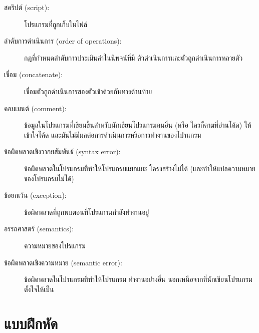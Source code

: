 \begin{description}
\item[สคริปต์ (script):] โปรแกรมที่ถูกเก็บในไฟล์

\item[ลำดับการดำเนินการ (order of operations):] กฎที่กำหนดลำดับการประเมินค่าในนิพจน์ที่มี
ตัวดำเนินการและตัวถูกดำเนินการหลายตัว  

\item[เชื่อม (concatenate):]  เชื่อมตัวถูกดำเนินการสองตัวเข้าด้วยกันทางด้านท้าย

\item[คอมเมนต์ (comment):]  ข้อมูลในโปรแกรมที่เขียนขึ้นสำหรับนักเขียนโปรแกรมคนอื่น (หรือ
ใครก็ตามที่อ่านโค้ด) ให้เข้าใจโค้ด และมันไม่มีผลต่อการดำเนินการหรือการทำงานของโปรแกรม 

\item[ข้อผิดพลาดเชิงวากยสัมพันธ์ (syntax error):]  ข้อผิดพลาดในโปรแกรมที่ทำให้โปรแกรมแยกแยะ
โครงสร้างไม่ได้ (และทำให้แปลความหมายของโปรแกรมไม่ได้) 

\item[ข้อยกเว้น (exception):]  ข้อผิดพลาดที่ถูกพบตอนที่โปรแกรมกำลังทำงานอยู่

\item[อรรถศาสตร์ (semantics):]  ความหมายของโปรแกรม

\item[ข้อผิดพลาดเชิงความหมาย (semantic error):]   ข้อผิดพลาดในโปรแกรมที่ทำให้โปรแกรม
ทำงานอย่างอื่น นอกเหนือจากที่นักเขียนโปรแกรมตั้งใจให้เป็น 

\end{description}


\section{แบบฝึกหัด}

